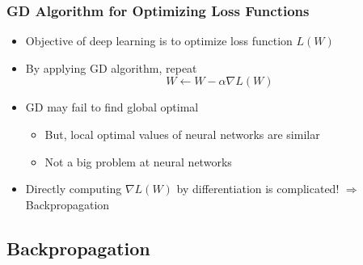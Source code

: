 \subsubsection*{GD Algorithm for Optimizing Loss Functions}
\begin{itemize}
    \item Objective of deep learning is to optimize loss function $L(W)$
    \item By applying GD algorithm, repeat
    \begin{equation}
        W\leftarrow W-\alpha\nabla L(W)
    \end{equation}
    \item GD may fail to find global optimal
    \begin{itemize}
        \item But, local optimal values of neural networks are similar
        \item Not a big problem at neural networks
    \end{itemize}
    \item Directly computing $\nabla L(W)$ by differentiation is complicated! $\Rightarrow$ Backpropagation
\end{itemize}

\subsection{Backpropagation}

